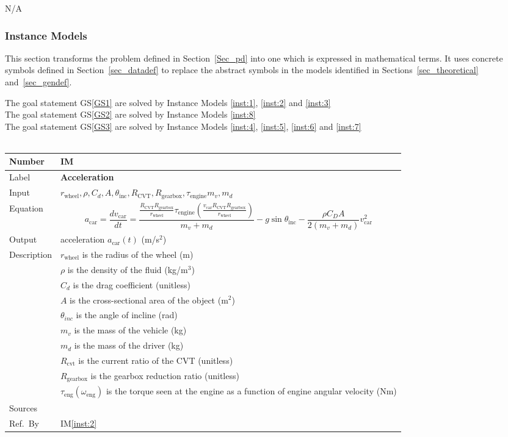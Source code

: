 \documentclass[12pt]{article}
\newcommand{\colAwidth}{0.13\textwidth}
\newcommand{\colBwidth}{0.82\textwidth}
\newcounter{instnum} %
\newcommand{\iref}[1]{IM\ref{#1}}
\newcommand{\definstance}[7] {
~\newline
\noindent
\begin{minipage}{\textwidth}
\renewcommand*{\arraystretch}{1.5}
\begin{tabular}{| p{\colAwidth} | p{\colBwidth}|}
  \hline
  \rowcolor[gray]{0.9}
  Number& IM\refstepcounter{instnum}\theinstnum \label{inst:\theinstnum}\\
  \hline
  Label& \bf #1 \\
  \hline
  Input& #2\\
  \hline
  Equation& #3\\
  \hline
  Output& #4\\
  \hline
  Description& #5 \\
  \hline
  Sources& #6 \\
  \hline
  Ref.\ By & #7\\
  \hline
\end{tabular}
\end{minipage}\\
}
\begin{document}
N/A

\subsubsection{Instance Models} \label{sec_instance}    

This section transforms the problem defined in Section~\ref{Sec_pd} into 
one which is expressed in mathematical terms. It uses concrete symbols defined 
in Section~\ref{sec_datadef} to replace the abstract symbols in the models 
identified in Sections~\ref{sec_theoretical} and~\ref{sec_gendef}.
{\newline}

{\noindent}The goal statement GS\ref{GS1} are solved by Instance Models \ref{inst:1}, \ref{inst:2} and \ref{inst:3}\\
{\noindent}The goal statement GS\ref{GS2} are solved by Instance Models \ref{inst:8}\\
The goal statement GS\ref{GS3} are solved by Instance Models \ref{inst:4}, \ref{inst:5}, \ref{inst:6} and \ref{inst:7}\\
  \definstance
  {Acceleration}
  {$r_{\text{wheel}}, \rho, C_d, A, \theta_{\text{inc}}, R_{\text{CVT}}, R_\text{gearbox}, \tau_\text{engine} m_v, m_d$}
  {
    \[a_\text{car} = \frac{dv_\text{car}}{dt} = \frac{\frac{R_\text{CVT} R_\text{gearbox}}{r_\text{wheel}} \tau_\text{engine}(\frac{v_\text{car} R_\text{CVT} R_\text{gearbox}}{r_\text{wheel}})}{m_v + m_d} - g\sin{\theta_\text{inc}} - \frac{\rho C_D A}{2(m_v + m_d)} v_\text{car}^2 \]
  }
  {acceleration $a_\text{car}(t)$ (m/s$^2$)}
  {
  $r_{\text{wheel}}$ is the radius of the wheel (m)\\
  & $\rho$ is the density of the fluid (kg/m$^3$)\\
  & $C_d$ is the drag coefficient (unitless)\\
  & $A$ is the cross-sectional area of the object (m$^2$)\\
  & $\theta_{inc}$ is the angle of incline (rad)\\
  & $m_v$ is the mass of the vehicle (kg)\\
  & $m_d$ is the mass of the driver (kg)\\
  & $R_\text{cvt}$ is the current ratio of the CVT (unitless)\\
  & $R_\text{gearbox}$ is the gearbox reduction ratio (unitless)\\
  & $\tau_{\text{eng}}(\omega_\text{eng})$ is the torque seen at the engine as a function of engine angular velocity (Nm)
}
{}
{\iref{inst:2}}
  
\end{document}
